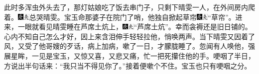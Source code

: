 此时多浑虫外头去了，那灯姑娘吃了饭去串门子，只剩下晴雯一人，在外间房内爬着。{\includegraphics[width=3mm]{../Images/00004}\includegraphics[width=3mm]{../Images/00012}\footnotesize \kaishu 总哭晴雯。}宝玉命那婆子在院门了哨，他独自掀起草帘{\includegraphics[width=3mm]{../Images/00004}\includegraphics[width=3mm]{../Images/00012}\footnotesize \kaishu “草帘”。}进来，一眼就看见晴雯睡在芦席土炕上，{\includegraphics[width=3mm]{../Images/00004}\includegraphics[width=3mm]{../Images/00012}\footnotesize \kaishu “芦席土炕”。}幸而衾褥还是旧日铺的。心内不知自己怎么才好，因上来含泪伸手轻轻拉他，悄唤两声。当下晴雯又因着了风，又受了他哥嫂的歹话，病上加病，嗽了一日，才朦胧睡了。忽闻有人唤他，强展星眸，一见是宝玉，又惊又喜，又悲又痛，忙一把死攥住他的手。哽咽了半日，方说出半句话来：“我只当不得见你了。”接着便嗽个不住。宝玉也只有哽咽之分。

